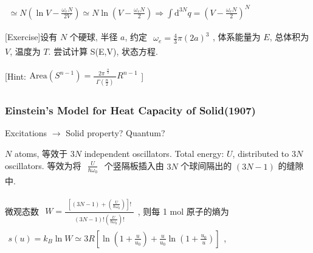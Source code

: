\documentclass[../../main.tex]{subfiles}
\begin{document}
$\begin{aligned}
    \simeq N\left(\ln{V} - \frac{\omega_{e}N}{2V}\right)\simeq N\ln{\left(V-\frac{\omega_{e}N}{2}\right)}\Rightarrow
    \int\mathrm{d}^{3N}q = \left(V - \frac{\omega_{e}N}{2}\right)^{N}
\end{aligned}$

[Exercise]设有 $N$ 个硬球, 半径 $a$, 约定 $\begin{aligned}
    \omega_{e} = \frac{4}{3}\pi (2a)^{3}
\end{aligned}$, 体系能量为 $E$, 总体积为 $V$, 温度为 $T$. 尝试计算 S(E,V), 状态方程. 

[Hint:$\begin{aligned}
    \text{Area}(S^{n-1}) = \frac{2\pi^{\begin{aligned}
        \frac{n}{2}
    \end{aligned}}}{\begin{aligned}
        \Gamma\left(\frac{n}{2}\right)
    \end{aligned}}R^{n-1}
\end{aligned}$]

\subsubsection{Einstein's Model for Heat Capacity of Solid(1907)}
Excitations $\rightarrow$ Solid property? Quantum? 

$N$ atoms, 等效于 $3N$ independent oscillators. Total energy: $U$, distributed to $3N$ oscillators. 等效为将 $\begin{aligned}
    \frac{U}{\hbar\omega_{0}}
\end{aligned}$ 个竖隔板插入由 $3N$ 个球间隔出的 $(3N-1)$ 的缝隙中.

微观态数 $\begin{aligned}
    W = \frac{\begin{aligned}
        \left[(3N-1)+\left(\frac{U}{\hbar\omega_{0}}\right)\right]!
    \end{aligned}}{\begin{aligned}
        (3N-1)!\left(\frac{U}{\hbar\omega_{0}}\right)!
    \end{aligned}}
\end{aligned}$, 则每 1 mol 原子的熵为 $\begin{aligned}
    s(u) = k_{B}\ln{W} \simeq 3R\left[\ln{\left(1 + \frac{u}{u_{0}}\right)} + \frac{u}{u_{0}}\ln{\left(1+\frac{u_{0}}{u}\right)}\right]
\end{aligned}$, 
\end{document}
